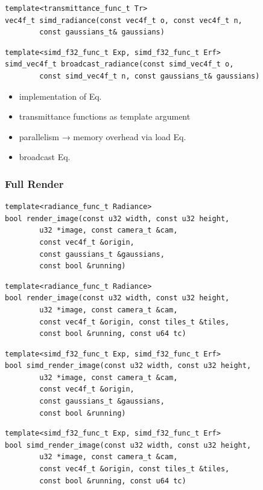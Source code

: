 \documentclass[a4paper, 11pt]{memoir}
\begin{document}
    \begin{verbatim}
template<transmittance_func_t Tr>
vec4f_t simd_radiance(const vec4f_t o, const vec4f_t n,
        const gaussians_t& gaussians)
    \end{verbatim}
    
    \begin{verbatim}
template<simd_f32_func_t Exp, simd_f32_func_t Erf>
simd_vec4f_t broadcast_radiance(const simd_vec4f_t o,
        const simd_vec4f_t n, const gaussians_t& gaussians)
    \end{verbatim}

    \begin{itemize}
        \item implementation of Eq.~
        \item transmittance functions as template argument
        \item parallelism →  memory overhead via load Eq.~
        \item broadcast Eq.~
    \end{itemize}
    
    \subsubsection{Full Render}
    \begin{verbatim}
template<radiance_func_t Radiance>
bool render_image(const u32 width, const u32 height,
        u32 *image, const camera_t &cam,
        const vec4f_t &origin,
        const gaussians_t &gaussians,
        const bool &running)
    \end{verbatim}

    \begin{verbatim}
template<radiance_func_t Radiance>
bool render_image(const u32 width, const u32 height,
        u32 *image, const camera_t &cam,
        const vec4f_t &origin, const tiles_t &tiles,
        const bool &running, const u64 tc)
    \end{verbatim}

    \begin{verbatim}
template<simd_f32_func_t Exp, simd_f32_func_t Erf>
bool simd_render_image(const u32 width, const u32 height,
        u32 *image, const camera_t &cam,
        const vec4f_t &origin,
        const gaussians_t &gaussians,
        const bool &running)
    \end{verbatim}

    \begin{verbatim}
template<simd_f32_func_t Exp, simd_f32_func_t Erf>
bool simd_render_image(const u32 width, const u32 height,
        u32 *image, const camera_t &cam,
        const vec4f_t &origin, const tiles_t &tiles,
        const bool &running, const u64 tc)
    \end{verbatim}
\end{document}
